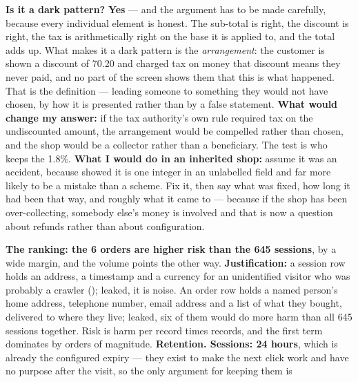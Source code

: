 \begin{ans}
  \item \textbf{Is it a dark pattern?} \textbf{Yes} --- and the argument has to
        be made carefully, because every individual element is honest. The
        sub-total is right, the discount is right, the tax is arithmetically
        right on the base it is applied to, and the total adds up. What makes
        it a dark pattern is the \emph{arrangement}: the customer is shown a
        discount of 70.20 and charged tax on money that discount means they
        never paid, and no part of the screen shows them that this is what
        happened. That is the definition --- leading someone to something they
        would not have chosen, by how it is presented rather than by a false
        statement. \textbf{What would change my answer:} if the tax authority's
        own rule required tax on the undiscounted amount, the arrangement would
        be compelled rather than chosen, and the shop would be a collector
        rather than a beneficiary. The test is who keeps the 1.8\%.
        \textbf{What I would do in an inherited shop:} assume it was an
        accident, because  showed it is one integer in an
        unlabelled field and far more likely to be a mistake than a scheme. Fix
        it, then say what was fixed, how long it had been that way, and
        roughly what it came to --- because if the shop has been
        over-collecting, somebody else's money is involved and that is now a
        question about refunds rather than about configuration.
  \item \textbf{The ranking: the 6 orders are higher risk than the 645
        sessions}, by a wide margin, and the volume points the other way.
        \textbf{Justification:} a session row holds an address, a timestamp
        and a currency for an unidentified visitor who was probably a crawler
        (); leaked, it is noise. An order row holds a named
        person's home address, telephone number, email address and a list of
        what they bought, delivered to where they live; leaked, six of them
        would do more harm than all 645 sessions together. Risk is harm per
        record times records, and the first term dominates by orders of
        magnitude. \textbf{Retention. Sessions: 24 hours}, which is already the
        configured expiry --- they exist to make the next click work and have
        no purpose after the visit, so the only argument for keeping them is

\end{ans}
